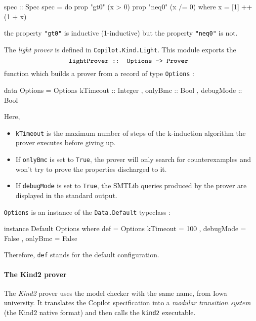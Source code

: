 \begin{code}
spec :: Spec
spec = do
  prop "gt0"  (x > 0)
  prop "neq0" (x /= 0)
  where
    x = [1] ++ (1 + x)
\end{code}

the property \texttt{"gt0"} is inductive (1-inductive) but the property
\texttt{"neq0"} is not.

The \emph{light prover} is defined in \texttt{Copilot.Kind.Light}. This
module exports the 
$$\texttt{lightProver :: Options -\textgreater{} Prover}$$ function which
builds a prover from a record of type \texttt{Options} :

\begin{code}
data Options = Options 
  { kTimeout  :: Integer
  , onlyBmc   :: Bool
  , debugMode :: Bool } 

\end{code}
Here,

\begin{itemize}
\itemsep1pt\parskip0pt
\item
  \texttt{kTimeout} is the maximum number of steps of the k-induction
  algorithm the prover executes before giving up.
\item
  If \texttt{onlyBmc} is set to \texttt{True}, the prover will only
  search for counterexamples and won't try to prove the properties
  discharged to it.
\item
  If \texttt{debugMode} is set to \texttt{True}, the SMTLib queries
  produced by the prover are displayed in the standard output.
\end{itemize}

\texttt{Options} is an instance of the \texttt{Data.Default} typeclass :

\begin{code}
instance Default Options where
  def = Options 
    { kTimeout  = 100
    , debugMode = False 
    , onlyBmc   = False }

\end{code}

Therefore, \texttt{def} stands for the default configuration.

\paragraph{The Kind2 prover}\label{the-kind2-prover}

The \emph{Kind2} prover uses the model checker with the same name, from
Iowa university. It translates the Copilot specification into a
\emph{modular transition system} (the Kind2 native format) and then
calls the \texttt{kind2} executable.

